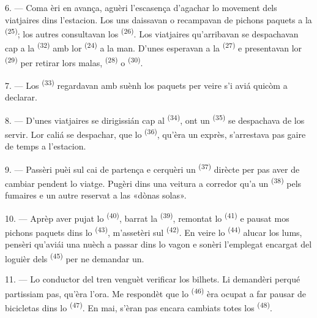 6. --- Coma èri en avança, aguèri l'escasença d'agachar lo movement dels
viatjaires dins l'estacion. Los uns daissavan o recampavan de pichons paquets a la
 \textsuperscript{(25)}; los autres consultavan los
 \textsuperscript{(26)}. Los viatjaires qu'arribavan se despachavan
cap a la  \textsuperscript{(32)} amb lor 
\textsuperscript{(24)} a la man. D'unes esperavan a la  \textsuperscript{(27)} e presentavan lor 
\textsuperscript{(29)} per retirar lors malas, 
\textsuperscript{(28)} o  \textsuperscript{(30)}.

7. --- Los  \textsuperscript{(33)} regardavan amb
suènh los paquets per veire s'i aviá quicòm a declarar.

8. --- D'unes viatjaires se dirigissián cap al 
\textsuperscript{(34)}, ont un  \textsuperscript{(35)} se despachava
de los servir. Lor caliá se despachar, que lo  \textsuperscript{(36)},
qu'èra un exprès, s'arrestava pas gaire de temps a l'estacion.

9. --- Passèri puèi sul cai de partença e cerquèri un 
\textsuperscript{(37)} dirècte per pas aver de cambiar pendent lo viatge. Pugèri
dins una veitura a corredor qu'a un  \textsuperscript{(38)}
pels fumaires e un autre reservat a las «dònas solas».

\VUsaut{3.0mm}

10. --- Aprèp aver pujat lo  \textsuperscript{(40)}, barrat la
 \textsuperscript{(39)}, remontat lo 
\textsuperscript{(41)} e pausat mos pichons paquets dins lo 
\textsuperscript{(43)}, m'assetèri sul  \textsuperscript{(42)}. En
veire lo  \textsuperscript{(44)} alucar los lums, pensèri qu'aviái
una nuèch a passar dins lo vagon e sonèri l'emplegat encargat del loguièr dels
 \textsuperscript{(45)} per ne demandar un.

11. --- Lo conductor del tren venguèt verificar los bilhets. Li demandèri perqué
partissiam pas, qu'èra l'ora. Me respondèt que lo 
\textsuperscript{(46)} èra ocupat a far pausar de bicicletas dins lo
 \textsuperscript{(47)}. En mai, s'èran pas encara cambiats totes
los  \textsuperscript{(48)}.

